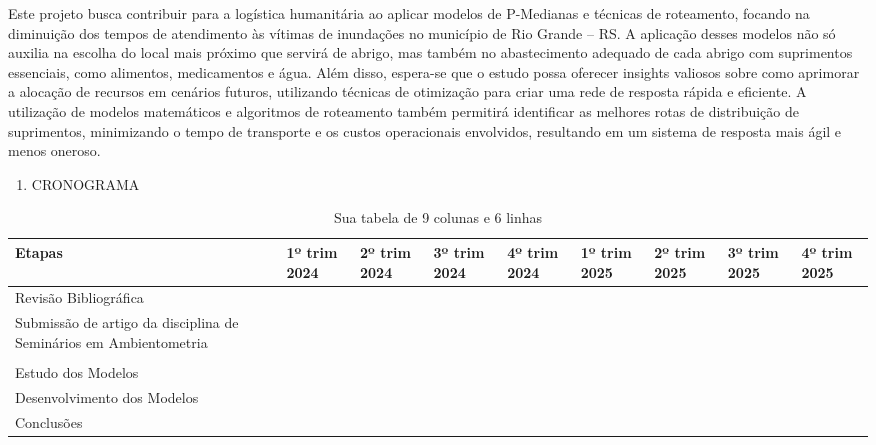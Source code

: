 \documentclass[
]{article}
\providecommand{\tightlist}{%
  \setlength{\itemsep}{0pt}\setlength{\parskip}{0pt}}
\begin{document}
Este projeto busca contribuir para a logística humanitária ao aplicar
modelos de P-Medianas e técnicas de roteamento, focando na diminuição
dos tempos de atendimento às vítimas de inundações no município de Rio
Grande -- RS. A aplicação desses modelos não só auxilia na escolha do
local mais próximo que servirá de abrigo, mas também no abastecimento
adequado de cada abrigo com suprimentos essenciais, como alimentos,
medicamentos e água. Além disso, espera-se que o estudo possa oferecer
insights valiosos sobre como aprimorar a alocação de recursos em
cenários futuros, utilizando técnicas de otimização para criar uma rede
de resposta rápida e eficiente. A utilização de modelos matemáticos e
algoritmos de roteamento também permitirá identificar as melhores rotas
de distribuição de suprimentos, minimizando o tempo de transporte e os
custos operacionais envolvidos, resultando em um sistema de resposta
mais ágil e menos oneroso.

\begin{enumerate}
\def\labelenumi{\arabic{enumi}.}
\setcounter{enumi}{5}
\tightlist
\item
  CRONOGRAMA
\end{enumerate}

\begin{table}[ht]
\centering
\begin{tabular}{|p{3cm}|p{1.5cm}|p{1.5cm}|p{1.5cm}|p{1.5cm}|p{1.5cm}|p{1.5cm}|p{1.5cm}|p{1.5cm}|}
\hline
Etapas & 1º trim 2024 & 2º trim 2024 & 3º trim 2024 & 4º trim 2024 & 1º trim 2025 & 2º trim 2025 & 3º trim 2025 & 4º trim 2025 \\ \hline
Revisão Bibliográfica   &    &    &    &    &    &    &    &    \\ \hline
Submissão de artigo da
disciplina de Seminários
em Ambientometria   &    &    &    &    &    &    &    &    \\ \hline
&    &    &    &    &    &    &    &    \\ \hline
Estudo dos Modelos   &    &    &    &    &    &    &    &    \\ \hline
Desenvolvimento dos Modelos
&    &    &    &    &    &    &    &    \\ \hline
Conclusões   &    &    &    &    &    &    &    &    \\ \hline
\end{tabular}
\caption{Sua tabela de 9 colunas e 6 linhas}
\end{table}
\end{document}
